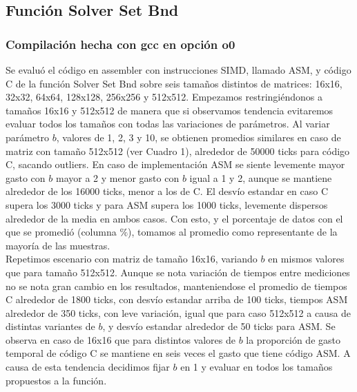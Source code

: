  

 
\subsection{Función Solver Set Bnd }
 \subsubsection{Compilación hecha con gcc en opción o0}
Se evaluó el código en assembler con instrucciones SIMD, llamado ASM, y código C de la función Solver Set Bnd sobre seis tamaños distintos de matrices: 16x16, 32x32, 64x64, 128x128, 256x256 y 512x512. Empezamos restringiéndonos a tamaños 16x16 y 512x512 de manera que si observamos tendencia evitaremos evaluar todos los tamaños con todas las variaciones de parámetros. Al variar parámetro $b$, valores de 1, 2, 3 y 10, se obtienen promedios similares en caso de matriz con tamaño 512x512 (ver Cuadro 1), alrededor de 50000 ticks para código C, sacando outliers. En caso de implementación ASM se siente levemente mayor gasto con $b$ mayor a 2 y menor gasto con $b$ igual a 1 y 2, aunque se mantiene alrededor de los 16000 ticks, menor a los de C. El desvío estandar en caso C supera los 3000 ticks y para ASM supera los 1000 ticks, levemente dispersos alrededor de la media en ambos casos. Con esto, y el porcentaje de datos con el que se promedió (columna $\%$), tomamos al promedio como representante de la mayoría de las muestras.\\
Repetimos escenario con matriz de tamaño 16x16, variando $b$ en mismos valores que para tamaño 512x512. Aunque se nota 
variación de tiempos entre mediciones no se nota gran cambio en los resultados, manteniendose el promedio de tiempos C alrededor de 1800 ticks, con desvío estandar arriba de 100 ticks, tiempos ASM alrededor de 350 ticks, con leve variación, igual que para caso 512x512 a causa de distintas variantes de $b$, y desvío estandar alrededor de 50 ticks para ASM.
Se observa en caso de 16x16 que para distintos valores de $b$ la proporción de gasto temporal de código C se mantiene en 
seis veces el gasto que tiene código ASM. A causa de esta tendencia decidimos fijar $b$ en 1 y evaluar en todos los tamaños propuestos a la función. 
\newline


